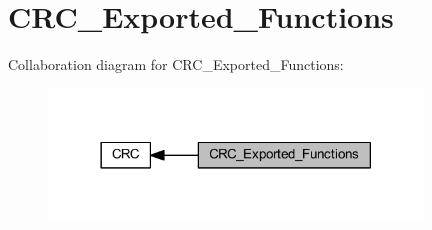 \hypertarget{group___c_r_c___exported___functions}{}\section{C\+R\+C\+\_\+\+Exported\+\_\+\+Functions}
\label{group___c_r_c___exported___functions}
Collaboration diagram for C\+R\+C\+\_\+\+Exported\+\_\+\+Functions\+:
\nopagebreak
\begin{figure}[H]
\begin{center}
\leavevmode
\includegraphics[width=282pt]{group___c_r_c___exported___functions}
\end{center}
\end{figure}

